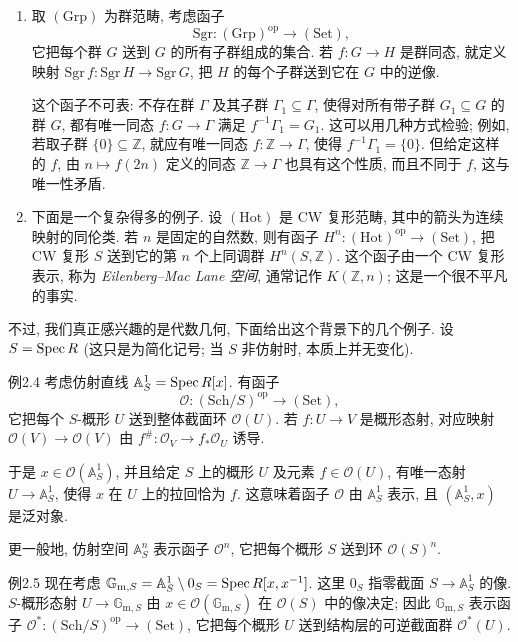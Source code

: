 \begin{enumerate}
\item[(iv)] 取 $(\mathrm{Grp})$ 为群范畴, 考虑函子
\[
\mathrm{Sgr}:(\mathrm{Grp})^{\mathrm{op}}\longrightarrow(\mathrm{Set}),
\]
它把每个群 $G$ 送到 $G$ 的所有子群组成的集合. 若 $f:G\to H$ 是群同态, 就定义映射 $\mathrm{Sgr}\,f:\mathrm{Sgr}\,H\to\mathrm{Sgr}\,G$, 把 $H$ 的每个子群送到它在 $G$ 中的逆像.

这个函子不可表: 不存在群 $\Gamma$ 及其子群 $\Gamma_1\subseteq\Gamma$, 使得对所有带子群 $G_1\subseteq G$ 的群 $G$, 都有唯一同态 $f:G\to\Gamma$ 满足 $f^{-1}\Gamma_1=G_1$. 这可以用几种方式检验; 例如, 若取子群 $\{0\}\subseteq\mathbb Z$, 就应有唯一同态 $f:\mathbb Z\to\Gamma$, 使得 $f^{-1}\Gamma_1=\{0\}$. 但给定这样的 $f$, 由 $n\mapsto f(2n)$ 定义的同态 $\mathbb Z\to\Gamma$ 也具有这个性质, 而且不同于 $f$, 这与唯一性矛盾.

\item[(v)] 下面是一个复杂得多的例子. 设 $(\mathrm{Hot})$ 是 CW 复形范畴, 其中的箭头为连续映射的同伦类. 若 $n$ 是固定的自然数, 则有函子 $H^n:(\mathrm{Hot})^{\mathrm{op}}\to(\mathrm{Set})$, 把 CW 复形 $S$ 送到它的第 $n$ 个上同调群 $H^n(S,\mathbb Z)$. 这个函子由一个 CW 复形表示, 称为 \emph{Eilenberg--Mac Lane 空间}, 通常记作 $K(\mathbb Z,n)$; 这是一个很不平凡的事实.
\end{enumerate}

不过, 我们真正感兴趣的是代数几何, 下面给出这个背景下的几个例子. 设 $S=\operatorname{Spec} R$ (这只是为简化记号; 当 $S$ 非仿射时, 本质上并无变化).

\begin{origstatement}{例}{2.4}\label{ch02:ex24}
考虑仿射直线 $\mathbb A^1_S=\operatorname{Spec} R[x]$. 有函子
\[
\mathcal O:(\mathrm{Sch}/S)^{\mathrm{op}}\longrightarrow(\mathrm{Set}),
\]
它把每个 $S$-概形 $U$ 送到整体截面环 $\mathcal O(U)$. 若 $f:U\to V$ 是概形态射, 对应映射 $\mathcal O(V)\to\mathcal O(V)$ 由 $f^\#:\mathcal O_V\to f_*\mathcal O_U$ 诱导.

于是 $x\in\mathcal O(\mathbb A^1_S)$, 并且给定 $S$ 上的概形 $U$ 及元素 $f\in\mathcal O(U)$, 有唯一态射 $U\to\mathbb A^1_S$, 使得 $x$ 在 $U$ 上的拉回恰为 $f$. 这意味着函子 $\mathcal O$ 由 $\mathbb A^1_S$ 表示, 且 $(\mathbb A^1_S,x)$ 是泛对象.

更一般地, 仿射空间 $\mathbb A^n_S$ 表示函子 $\mathcal O^n$, 它把每个概形 $S$ 送到环 $\mathcal O(S)^n$.
\end{origstatement}

\begin{origstatement}{例}{2.5}\label{ch02:ex25}
现在考虑 $\mathbb G_{\mathrm m,S}=\mathbb A^1_S\setminus0_S=\operatorname{Spec} R[x,x^{-1}]$. 这里 $0_S$ 指零截面 $S\to\mathbb A^1_S$ 的像. $S$-概形态射 $U\to\mathbb G_{\mathrm m,S}$ 由 $x\in\mathcal O(\mathbb G_{\mathrm m,S})$ 在 $\mathcal O(S)$ 中的像决定; 因此 $\mathbb G_{\mathrm m,S}$ 表示函子 $\mathcal O^*:(\mathrm{Sch}/S)^{\mathrm{op}}\to(\mathrm{Set})$, 它把每个概形 $U$ 送到结构层的可逆截面群 $\mathcal O^*(U)$.
\end{origstatement}

